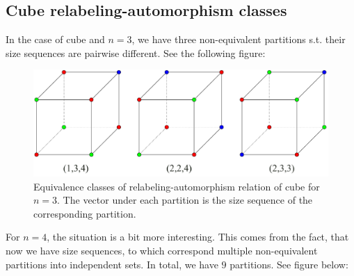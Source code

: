 \subsection{Cube relabeling-automorphism classes}

In the case of cube and $n=3$, we have three non-equivalent partitions s.t. their size sequences are pairwise different. See the following figure: 

\begin{figure}[H]
    \centering
    \includegraphics[width=1\textwidth]{Resources/Figs/cube_non_relaut-3-clrings.pdf}
    \caption{Equivalence classes of relabeling-automorphism relation of cube for $n=3$. The vector under each partition is the size sequence of the corresponding partition.}
    \label{fig:cube-3clring-relaut-classes}
\end{figure}

For $n=4$, the situation is a bit more interesting. This comes from the fact, that now we have size sequences, to which correspond multiple non-equivalent partitions into independent sets. In total, we have $9$ partitions. See figure below:

